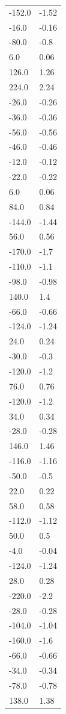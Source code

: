 \begin{longtable}{ll}
-152.0 & -1.52 \\
-16.0 & -0.16 \\
-80.0 & -0.8 \\
6.0 & 0.06 \\
126.0 & 1.26 \\
224.0 & 2.24 \\
-26.0 & -0.26 \\
-36.0 & -0.36 \\
-56.0 & -0.56 \\
-46.0 & -0.46 \\
-12.0 & -0.12 \\
-22.0 & -0.22 \\
6.0 & 0.06 \\
84.0 & 0.84 \\
-144.0 & -1.44 \\
56.0 & 0.56 \\
-170.0 & -1.7 \\
-110.0 & -1.1 \\
-98.0 & -0.98 \\
140.0 & 1.4 \\
-66.0 & -0.66 \\
-124.0 & -1.24 \\
24.0 & 0.24 \\
-30.0 & -0.3 \\
-120.0 & -1.2 \\
76.0 & 0.76 \\
-120.0 & -1.2 \\
34.0 & 0.34 \\
-28.0 & -0.28 \\
146.0 & 1.46 \\
-116.0 & -1.16 \\
-50.0 & -0.5 \\
22.0 & 0.22 \\
58.0 & 0.58 \\
-112.0 & -1.12 \\
50.0 & 0.5 \\
-4.0 & -0.04 \\
-124.0 & -1.24 \\
28.0 & 0.28 \\
-220.0 & -2.2 \\
-28.0 & -0.28 \\
-104.0 & -1.04 \\
-160.0 & -1.6 \\
-66.0 & -0.66 \\
-34.0 & -0.34 \\
-78.0 & -0.78 \\
138.0 & 1.38 \\

\end{longtable}
